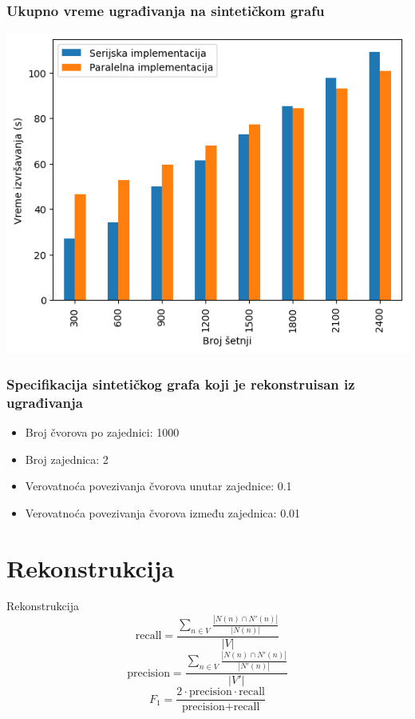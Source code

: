 \documentclass{beamer}
\begin{document}
\begin{frame}
    \frametitle{Ukupno vreme ugrađivanja na sintetičkom grafu}
    \centering
    \includegraphics[height=0.8\textheight]{csv/4.13.png}
\end{frame}

\begin{frame}
    \frametitle{Specifikacija sintetičkog grafa koji je rekonstruisan iz ugrađivanja}
    \begin{itemize}
        \item Broj čvorova po zajednici: 1000
        \item Broj zajednica: 2
        \item Verovatnoća povezivanja čvorova unutar zajednice: 0.1
        \item Verovatnoća povezivanja čvorova između zajednica: 0.01
    \end{itemize}
\end{frame}


\section{Rekonstrukcija}
\begin{frame}{Rekonstrukcija}
    $$ \text{recall} = \frac{\sum_{n \in V} \frac{|N(n) \cap N'(n)|}{|N(n)|}}{|V|} $$
    $$ \text{precision} = \frac{\sum_{n \in V} \frac{|N(n) \cap N'(n)|}{|N'(n)|}}{|V'|} $$
    $$ F_1 = \frac{2 \cdot \text{precision} \cdot \text{recall}}{\text{precision} + \text{recall}} $$
\end{frame}
\end{document}
